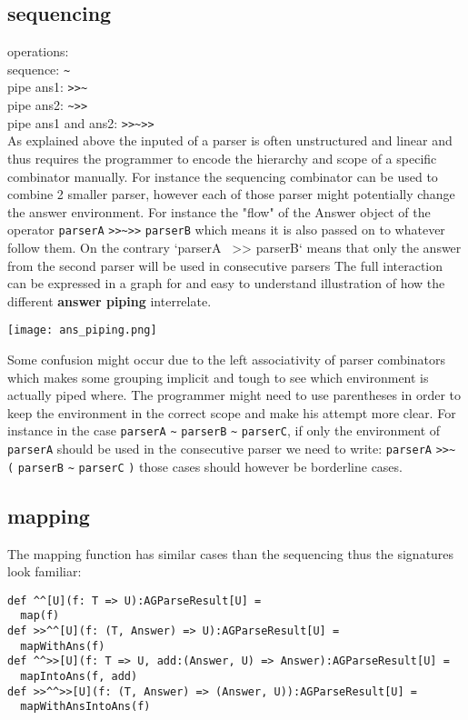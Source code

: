 \subsection{sequencing}
operations:\\
sequence: \verb/~/ \\
pipe ans1: \verb/>>~/ \\
pipe ans2: \verb/~>>/ \\
pipe ans1 and ans2: \verb/>>~>>/ \\

As explained above the inputed of a parser is often unstructured and linear and thus requires the programmer to encode the hierarchy and scope of a specific combinator manually. 
For instance the sequencing combinator can be used to combine 2 smaller parser, however each of those parser might potentially change the answer environment.
For instance the "flow" of the Answer object of the operator \verb/parserA/ \verb/>>~>>/ \verb/parserB/ which means it is also passed on to whatever follow them. On the contrary `parserA ~>> parserB` means that only the answer from the second parser will be used in consecutive parsers
The full interaction can be expressed in a graph for and easy to understand illustration of how the different \textbf{answer piping} interrelate.

\texttt{[image: ans\_piping.png]}

Some confusion might occur due to the left associativity of parser combinators which makes some grouping implicit and tough to see which environment is actually piped where.
The programmer might need to use parentheses in order to keep the environment in the correct scope and make his attempt more clear. For instance in the case \verb/parserA/ \verb/~/ \verb/parserB/ \verb/~/ \verb/parserC/, if only the environment of \verb/parserA/ should be used in the consecutive parser we need to write: \verb/parserA/ \verb/>>~/ \verb/(/ \verb/parserB/ \verb/~/ \verb/parserC/ \verb/)/ those cases should however be borderline cases.

\subsection{mapping}
The mapping function has similar cases than the sequencing thus the signatures look familiar:
\begin{lstlisting}
def ^^[U](f: T => U):AGParseResult[U] =
  map(f)
def >>^^[U](f: (T, Answer) => U):AGParseResult[U] =
  mapWithAns(f)
def ^^>>[U](f: T => U, add:(Answer, U) => Answer):AGParseResult[U] =
  mapIntoAns(f, add)
def >>^^>>[U](f: (T, Answer) => (Answer, U)):AGParseResult[U] =
  mapWithAnsIntoAns(f)
\end{lstlisting}

